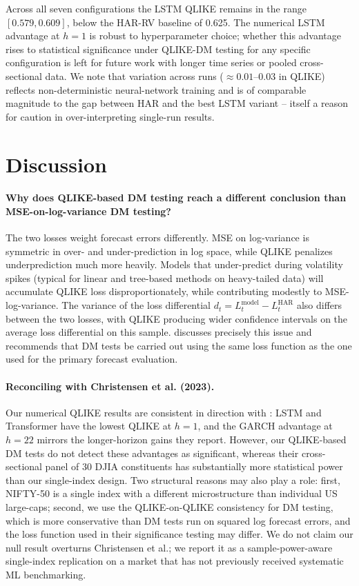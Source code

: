 \documentclass[11pt]{article}
\begin{document}
Across all seven configurations the LSTM QLIKE remains in the
range $[0.579, 0.609]$, below the HAR-RV baseline of 0.625. The
numerical LSTM advantage at $h=1$ is robust to hyperparameter
choice; whether this advantage rises to statistical significance
under QLIKE-DM testing for any specific configuration is left for
future work with longer time series or pooled cross-sectional data.
We note that variation across runs ($\approx 0.01\text{--}0.03$ in
QLIKE) reflects non-deterministic neural-network training and is of
comparable magnitude to the gap between HAR and the best LSTM
variant -- itself a reason for caution in over-interpreting
single-run results.

\section{Discussion}
\label{sec:discussion}

\paragraph{Why does QLIKE-based DM testing reach a different
conclusion than MSE-on-log-variance DM testing?}
The two losses weight forecast errors differently. MSE on
log-variance is symmetric in over- and under-prediction in log
space, while QLIKE penalizes underprediction much more heavily.
Models that under-predict during volatility spikes (typical for
linear and tree-based methods on heavy-tailed data) will accumulate
QLIKE loss disproportionately, while contributing modestly to
MSE-log-variance. The variance of the loss differential
$d_t = L^{\mathrm{model}}_t - L^{\mathrm{HAR}}_t$ also differs
between the two losses, with QLIKE producing wider confidence
intervals on the average loss differential on this sample.
\citet{patton2009volatility} discusses precisely this issue and
recommends that DM tests be carried out using the same loss
function as the one used for the primary forecast evaluation.

\paragraph{Reconciling with Christensen et al. (2023).}
Our numerical QLIKE results are consistent in direction with
\citet{christensen2023machine}: LSTM and Transformer have the
lowest QLIKE at $h=1$, and the GARCH advantage at $h=22$
mirrors the longer-horizon gains they report. However, our
QLIKE-based DM tests do not detect these advantages as significant,
whereas their cross-sectional panel of 30 DJIA constituents has
substantially more statistical power than our single-index design.
Two structural reasons may also play a role: first, NIFTY-50 is
a single index with a different microstructure than individual US
large-caps; second, we use the QLIKE-on-QLIKE consistency for DM
testing, which is more conservative than DM tests run on squared
log forecast errors, and the loss function used in their
significance testing may differ. We do not claim our null result
overturns Christensen et al.; we report it as a sample-power-aware
single-index replication on a market that has not previously
received systematic ML benchmarking.
\end{document}
